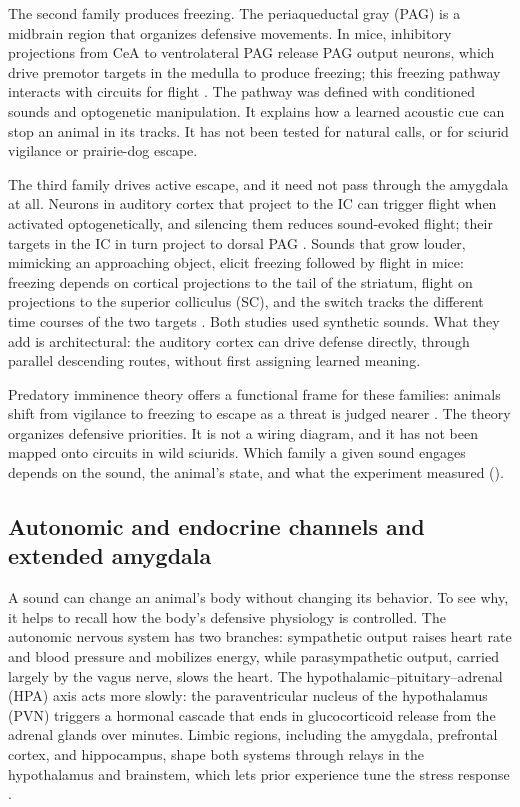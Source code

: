 The second family produces freezing. The periaqueductal gray (PAG) is a midbrain region that organizes defensive movements. In mice, inhibitory projections from CeA to ventrolateral PAG release PAG output neurons, which drive premotor targets in the medulla to produce freezing; this freezing pathway interacts with circuits for flight \citep{TovoteEtAl2016}. The pathway was defined with conditioned sounds and optogenetic manipulation. It explains how a learned acoustic cue can stop an animal in its tracks. It has not been tested for natural calls, or for sciurid vigilance or prairie-dog escape.

The third family drives active escape, and it need not pass through the amygdala at all. Neurons in auditory cortex that project to the IC can trigger flight when activated optogenetically, and silencing them reduces sound-evoked flight; their targets in the IC in turn project to dorsal PAG \citep{XiongEtAl2015}. Sounds that grow louder, mimicking an approaching object, elicit freezing followed by flight in mice: freezing depends on cortical projections to the tail of the striatum, flight on projections to the superior colliculus (SC), and the switch tracks the different time courses of the two targets \citep{LiEtAl2021}. Both studies used synthetic sounds. What they add is architectural: the auditory cortex can drive defense directly, through parallel descending routes, without first assigning learned meaning.

Predatory imminence theory offers a functional frame for these families: animals shift from vigilance to freezing to escape as a threat is judged nearer \citep{Fanselow1994}. The theory organizes defensive priorities. It is not a wiring diagram, and it has not been mapped onto circuits in wild sciurids. Which family a given sound engages depends on the sound, the animal's state, and what the experiment measured ().

\subsection{Autonomic and endocrine channels and extended amygdala}
\label{sec:mechanisms-autonomic}

A sound can change an animal's body without changing its behavior. To see why, it helps to recall how the body's defensive physiology is controlled. The autonomic nervous system has two branches: sympathetic output raises heart rate and blood pressure and mobilizes energy, while parasympathetic output, carried largely by the vagus nerve, slows the heart. The hypothalamic--pituitary--adrenal (HPA) axis acts more slowly: the paraventricular nucleus of the hypothalamus (PVN) triggers a hormonal cascade that ends in glucocorticoid release from the adrenal glands over minutes. Limbic regions, including the amygdala, prefrontal cortex, and hippocampus, shape both systems through relays in the hypothalamus and brainstem, which lets prior experience tune the stress response \citep{UlrichLaiHerman2009}.


